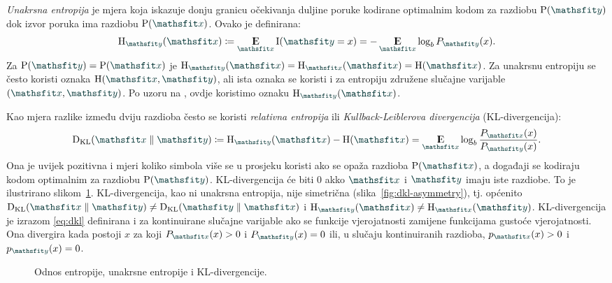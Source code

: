 \documentclass[utf8, diplomski, lmodern]{fer}
\begin{document}
\emph{Unakrsna entropija} je mjera koja iskazuje donju granicu očekivanja duljine poruke kodirane optimalnim kodom za razdiobu $\P(\rvar y)$ dok izvor poruka ima  razdiobu $\P(\rvar x)$. Ovako je definirana:
\begin{align}
\H_{\rvar y}(\rvar x)\coloneqq \E_{\rvar x}\I(\rvar y=x) = -\E_{\rvar x}\log_b P_{\rvar y}(x) \text{.}
\end{align}
Za $\P(\rvar y) = \P(\rvar x)$ je $\H_{\rvar y}(\rvar x) = \H_{\rvar x}(\rvar x)=\H(\rvar x)$. Za unakrsnu entropiju se često koristi oznaka $\H(\rvar x,\rvar y)$, ali ista oznaka se koristi i za entropiju združene slučajne varijable $(\rvar x,\rvar y)$. Po uzoru na \citet{Olah:2015:VIT}, ovdje koristimo oznaku $\H_{\rvar y}(\rvar x)$.

Kao mjera razlike između dviju razdioba često se koristi \emph{relativna entropija} ili \emph{Kullback-Leiblerova divergencija} (KL-divergencija):
\begin{align}
	\Dkl{\rvar x}{\rvar y} \coloneqq \H_{\rvar y}(\rvar x) - \H(\rvar x) = \E_{\rvar x} \log_b\frac{P_{\rvar x}(x)}{P_{\rvar y}(x)} \text{.}
	\label{eq:dkl}
\end{align}
Ona je uvijek pozitivna i mjeri koliko simbola više se u prosjeku koristi ako se opaža razdioba $\P(\rvar x)$, a događaji se kodiraju kodom optimalnim za razdiobu $\P(\rvar y)$. KL-divergencija će biti $0$ akko $\rvar x$ i $\rvar y$ imaju iste razdiobe. To je ilustrirano slikom~\ref{fig:dkl}. KL-divergencija, kao ni unakrsna entropija, nije simetrična (slika~\ref{fig:dkl-asymmetry}), tj. općenito $\Dkl{\rvar x}{\rvar y}\neq\Dkl{\rvar y}{\rvar x}$ i $\H_{\rvar y}(\rvar x)\neq\H_{\rvar x}(\rvar y)$. KL-divergencija je izrazom \eqref{eq:dkl} definirana i za kontinuirane slučajne varijable ako se funkcije vjerojatnosti zamijene funkcijama gustoće vjerojatnosti. Ona divergira kada postoji $x$ za koji $P_{\rvar x}(x)>0$ i $P_{\rvar y}(x)=0$ ili, u slučaju kontinuiranih razdioba, $p_{\rvar x}(x)>0$ i $p_{\rvar y}(x)=0$.

\begin{figure}
	\centering
	\caption{Odnos entropije, unakrsne entropije i KL-divergencije.}
	\label{fig:dkl}
\end{figure}
\end{document}
